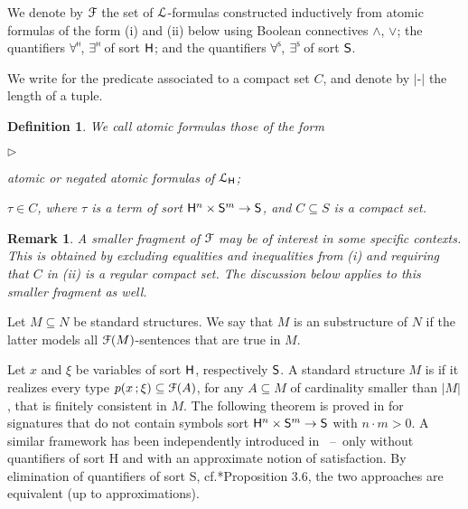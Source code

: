 \documentclass{amsproc}
\newcommand{\mylabel}[1]{{#1}\hfill}
\renewenvironment{itemize}
  {\begin{list}{$\triangleright$}{%
  \setlength{\parskip}{0mm}
  \setlength{\topsep}{.1\baselineskip}
  \setlength{\rightmargin}{0mm}
  \setlength{\listparindent}{0mm}
  \setlength{\itemindent}{0mm}
  \setlength{\labelwidth}{3ex}
  \setlength{\itemsep}{.1\baselineskip}
  \setlength{\parsep}{.1\baselineskip}
  \setlength{\partopsep}{0mm}
  \setlength{\labelsep}{1ex}
  \setlength{\leftmargin}{\labelwidth+\labelsep}
  \let\makelabel\mylabel}}{%
\end{list}}
\newcounter{thm}
\theoremstyle{mio}
\newtheorem{definition}[thm]{Definition}\tcolorboxenvironment{definition}{mythm}
\newtheorem{remark}[thm]{Remark}\tcolorboxenvironment{remark}{mythm}
\renewcommand*{\emph}[1]{%
   \smash{\tikz[baseline]\node[rectangle, fill=teal!25, rounded corners, inner xsep=0.5ex, inner ysep=0.2ex, anchor=base, minimum height = 2.7ex]{\strut #1};}}
\begin{document}
We denote by ${\EuScript F}$ the set of ${\EuScript L}$-formulas constructed inductively from atomic formulas of the form (i) and (ii) below using Boolean connectives $\wedge$, $\vee$; the quantifiers $\forall\raisebox{1.1ex}{\scaleto{\sf H}{.8ex}\kern-.2ex}$, $\exists\raisebox{1.1ex}{\scaleto{\sf H}{.8ex}\kern-.2ex}$ of sort ${\sf H}$; and the quantifiers $\forall\raisebox{1.1ex}{\scaleto{\sf S}{.8ex}\kern-.2ex}$, $\exists\raisebox{1.1ex}{\scaleto{\sf S}{.8ex}\kern-.2ex}$ of sort ${\sf S}$.

We write \emph{$x\in C$\/} for the predicate associated to a compact set $C$, and denote by $|\mbox{-}|$ the length of a tuple.

\begin{definition}
  We call atomic formulas those of the form
  \begin{itemize}
  \item[i.] atomic or negated atomic formulas of ${\EuScript L}_{\sf H}$;
  \item[ii.] $\tau\in C$, where $\tau$ is a term of sort ${\sf H}^n\times {\sf S}^m\to {\sf S}$, and $C\subseteq S$ is a compact set.
  \end{itemize}
\end{definition}

\begin{remark}
  A smaller fragment of ${\EuScript F}$ may be of interest in some specific contexts.
  This is obtained by excluding equalities and inequalities from (i) and requiring that $C$ in (ii) is a regular compact set.
  The discussion below applies to this smaller fragment as well.
\end{remark}

 Let $M\subseteq N$ be standard structures.
 We say that $M$ is an \emph{${\EuScript F}$-elementary\/} substructure of $N$ if the latter models all ${\EuScript F}(M)$-sentences that are true in $M$.

 Let $x$ and $\xi$ be variables of sort ${\sf H}$, respectively ${\sf S}$.
 A standard structure $M$ is \emph{${\EuScript F}$-saturated\/} if it realizes every type $p(x\,;\xi)\subseteq{\EuScript F}(A)$, for any $A\subseteq M$ of cardinality smaller than $|M|$, that is finitely consistent in $M$.
 The following theorem is proved in \cite{clcl} for signatures that do not contain symbols sort ${\sf H}^n\times{\sf S}^m\to {\sf S}$ with $n{\cdot}m>0$.
 A similar framework has been independently introduced in \cite{PC}~--~only without quantifiers of sort {\sf H} and with an approximate notion of satisfaction.
 By elimination of quantifiers of sort {\sf S}, cf.\@ \cite{clcl}*{Proposition 3.6}, the two approaches are equivalent (up to approximations).
\end{document}
